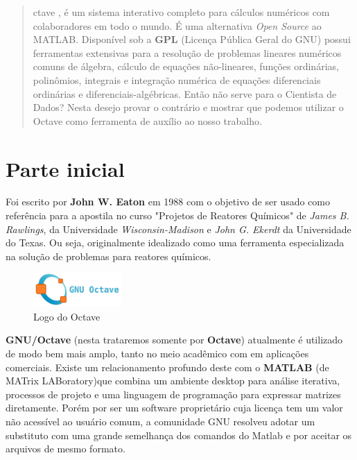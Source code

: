 \documentclass[a4paper,11pt]{article}
\begin{document}
	
	\maketitle %
	\thispagestyle{fancy} %
	
\begin{abstract}
	ctave \cite{octaveoficial}, é um sistema interativo completo para cálculos numéricos com colaboradores em todo o mundo. É uma alternativa \textit{Open Source} ao MATLAB. Disponível sob a \textbf{GPL} (Licença Pública Geral do GNU) possui ferramentas extensivas para a resolução de problemas lineares numéricos comuns de álgebra, cálculo de equações não-lineares, funções ordinárias, polinômios, integrais e integração numérica de equações diferenciais ordinárias e diferenciais-algébricas. Então não serve para o Cientista de Dados? Nesta desejo provar o contrário e mostrar que podemos utilizar o Octave como ferramenta de auxílio ao nosso trabalho.
\end{abstract}

\section{Parte inicial}
Foi escrito por \textbf{John W. Eaton} em 1988 com o objetivo de ser usado como referência para a apostila no curso "Projetos de Reatores Químicos" de \textit{James B. Rawlings}, da Universidade \textit{Wisconsin-Madison} e \textit{John G. Ekerdt} da Universidade do Texas. Ou seja, originalmente idealizado como uma ferramenta especializada na solução de problemas para reatores químicos.
\begin{figure}[H]
	\centering
	\includegraphics[width=0.3\textwidth]{imagem/logo}
	\caption{Logo do Octave}
\end{figure}

\textbf{GNU/Octave} (nesta trataremos somente por \textbf{Octave}) atualmente é utilizado de modo bem mais amplo, tanto no meio acadêmico com em aplicações comerciais. Existe um relacionamento profundo deste com o \textbf{MATLAB} (de MATrix LABoratory)que combina um ambiente desktop para análise iterativa, processos de projeto e uma linguagem de programação para expressar matrizes diretamente. Porém por ser um software proprietário cuja licença tem um valor não acessível ao usuário comum, a comunidade GNU resolveu adotar um substituto com uma grande semelhança dos comandos do Matlab e por aceitar os arquivos de mesmo formato.
\end{document}
